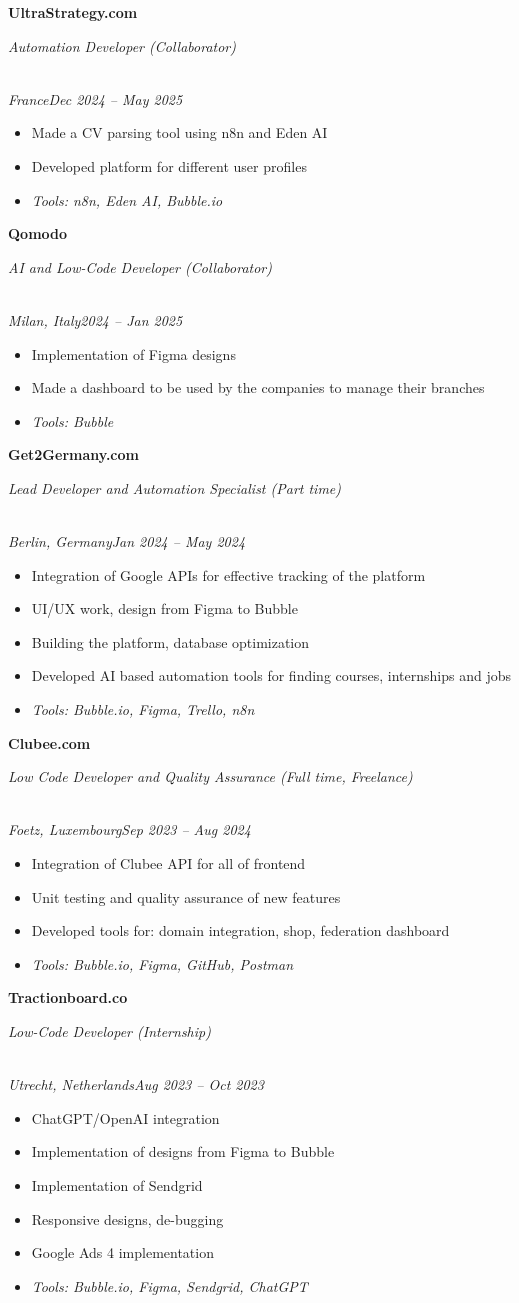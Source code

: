 \documentclass[a4paper,10pt]{article}
\newcommand{\role}[4]{\vspace{3pt}\noindent\hspace{0.6em}\parbox[t]{0.38\textwidth}{\raggedright\textbf{#1}}\hfill\parbox[t]{0.58\textwidth}{\raggedleft\textit{#2}}\\{\textit{#3}\hfill\textit{#4}}\vspace{1pt}}
\begin{document}
\role{UltraStrategy.com}{Automation Developer (Collaborator)}{France}{Dec 2024 -- May 2025}
\begin{itemize}
\item Made a CV parsing tool using n8n and Eden AI
\item Developed platform for different user profiles
\item \textit{Tools: n8n, Eden AI, Bubble.io}
\end{itemize}

\role{Qomodo}{AI and Low-Code Developer (Collaborator)}{Milan, Italy}{2024 -- Jan 2025}
\begin{itemize}
\item Implementation of Figma designs
\item Made a dashboard to be used by the companies to manage their branches
\item \textit{Tools: Bubble}
\end{itemize}

\role{Get2Germany.com}{Lead Developer and Automation Specialist (Part time)}{Berlin, Germany}{Jan 2024 -- May 2024}
\begin{itemize}
\item Integration of Google APIs for effective tracking of the platform
\item UI/UX work, design from Figma to Bubble
\item Building the platform, database optimization
\item Developed AI based automation tools for finding courses, internships and jobs
\item \textit{Tools: Bubble.io, Figma, Trello, n8n}
\end{itemize}

\role{Clubee.com}{Low Code Developer and Quality Assurance (Full time, Freelance)}{Foetz, Luxembourg}{Sep 2023 -- Aug 2024}
\begin{itemize}
\item Integration of Clubee API for all of frontend
\item Unit testing and quality assurance of new features
\item Developed tools for: domain integration, shop, federation dashboard
\item \textit{Tools: Bubble.io, Figma, GitHub, Postman}
\end{itemize}

\role{Tractionboard.co}{Low-Code Developer (Internship)}{Utrecht, Netherlands}{Aug 2023 -- Oct 2023}
\begin{itemize}
\item ChatGPT/OpenAI integration
\item Implementation of designs from Figma to Bubble
\item Implementation of Sendgrid
\item Responsive designs, de-bugging
\item Google Ads 4 implementation
\item \textit{Tools: Bubble.io, Figma, Sendgrid, ChatGPT}
\end{itemize}
\end{document}
